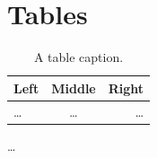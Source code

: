 \section{Tables}
\label{app:how-to:tables}

\begin{table}
  \centering
  \begin{tabular}{lcr}
    \toprule
    Left   & Middle & Right\\
    \midrule
    \ldots & \ldots & \ldots \\
    \bottomrule
  \end{tabular}
  \caption{A table caption.}
  \label{tab:how-to:tables:example}
\end{table}
\ldots
\par

